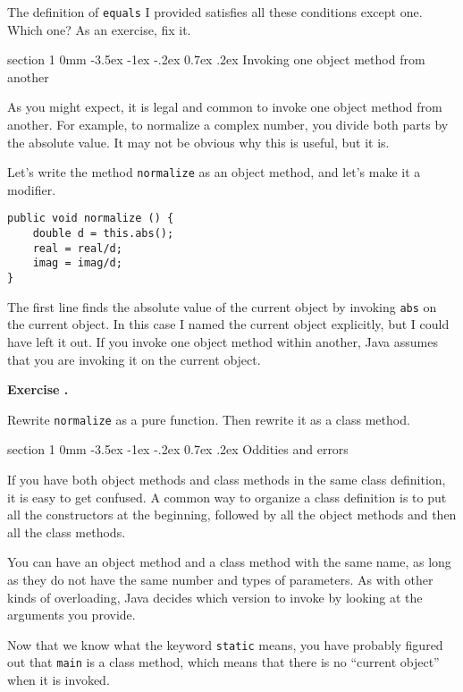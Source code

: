 \documentclass{book}
\makeatletter
\newcounter{exercisenum}
\renewcommand{\theexercisenum}{{\thechapter}.\arabic{exercisenum}}
\newenvironment{exercisesize}{\begin{small}}{\end{small}}
\newcommand{\exerciseheader}[2]{                                          
     
  \begin{exercisesize}                                                    
     
     
  \def\theenumi{\alph{enumi}}                                             
  \def\labelenumi{\theenumi.}                                             
  \def\theenumii{\roman{enumii}}                                          
  \def\labelenumii{\theenumii.}                                           
  {\bf Exercise {#1}{#2}}\hspace{0.1in}                 
}
\newcommand{\startexercise}[1]{%
  \refstepcounter{exercisenum}                                            
  \exerciseheader{\theexercisenum}{#1}                                    
}
\newcommand{\stopexercise}{%
  {\hfill}                                                               
  \end{exercisesize}      
}
\newcommand{\normaldif}{}
\newenvironment{exercise}{\startexercise{\normaldif{}}}{\stopexercise}
\renewcommand{\section}{\@startsection 
    {section} {1} {0mm}%
    {-3.5ex \@plus -1ex \@minus -.2ex}%
    {0.7ex \@plus.2ex}%
    {\normalfont\Large\bfseries}}
\makeatother
\begin{document}
The definition of {\tt equals} I provided satisfies all these
conditions except one.  Which one?  As an exercise, fix it.


\section{Invoking one object method from another}

As you might expect, it is legal and common to invoke
one object method from another.  For example, to normalize a
complex number, you divide both parts by the absolute
value.  It may not be obvious why this is useful, but it is.

Let's write the method {\tt normalize} as an object method, and
let's make it a modifier.

\begin{verbatim}
public void normalize () {
    double d = this.abs();
    real = real/d;
    imag = imag/d;
}
\end{verbatim}
%
The first line finds the absolute value of the current object
by invoking {\tt abs} on the current object.  In this case
I named the current object explicitly, but I could have left
it out.  If you invoke one object method within another, Java
assumes that you are invoking it on the current object.

\begin{exercise}
Rewrite {\tt normalize} as a pure function. 
Then rewrite it as a class method.
\end{exercise}


\section{Oddities and errors}

If you have both object methods and class methods in the same class
definition, it is easy to get confused.  A common way to organize a
class definition is to put all the constructors at the beginning,
followed by all the object methods and then all the class methods.

You can have an object method and a class method with the same
name, as long as they do not have the same number and types of
parameters.  As with other kinds of overloading, Java decides
which version to invoke by looking at the arguments you provide.


Now that we know what the keyword {\tt static} means, you
have probably figured out that {\tt main} is a class method,
which means that there is no ``current object'' when it is invoked.
\end{document}
